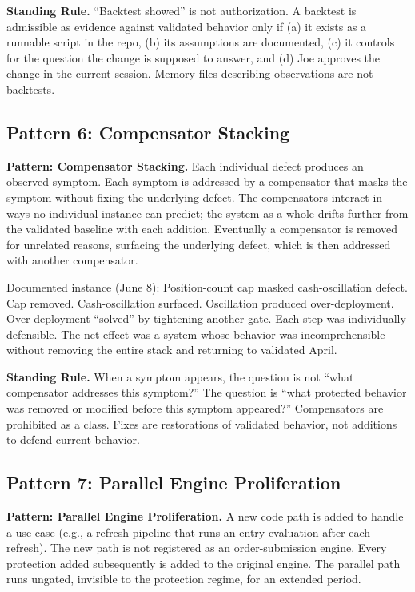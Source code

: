\documentclass[11pt, a4paper]{article}
\newcommand{\rulebox}[1]{%
  \begin{framed}\noindent\textbf{Standing Rule.} #1\end{framed}}
\newcommand{\patternbox}[2]{%
  \begin{framed}\noindent\textbf{Pattern: #1.} #2\end{framed}}
\theoremstyle{definition}
\begin{document}
\rulebox{``Backtest showed'' is not authorization. A backtest is admissible
as evidence against validated behavior only if (a) it exists as a runnable
script in the repo, (b) its assumptions are documented, (c) it controls for
the question the change is supposed to answer, and (d) Joe approves the
change in the current session. Memory files describing observations are not
backtests.}

\subsection{Pattern 6: Compensator Stacking}

\patternbox{Compensator Stacking}{Each individual defect produces an
observed symptom. Each symptom is addressed by a compensator that masks the
symptom without fixing the underlying defect. The compensators interact in
ways no individual instance can predict; the system as a whole drifts
further from the validated baseline with each addition. Eventually a
compensator is removed for unrelated reasons, surfacing the underlying
defect, which is then addressed with another compensator.}

Documented instance (June 8): Position-count cap masked cash-oscillation
defect. Cap removed. Cash-oscillation surfaced. Oscillation produced
over-deployment. Over-deployment ``solved'' by tightening another gate. Each
step was individually defensible. The net effect was a system whose behavior
was incomprehensible without removing the entire stack and returning to
validated April.

\rulebox{When a symptom appears, the question is not ``what compensator
addresses this symptom?'' The question is ``what protected behavior was
removed or modified before this symptom appeared?'' Compensators are
prohibited as a class. Fixes are restorations of validated behavior, not
additions to defend current behavior.}

\subsection{Pattern 7: Parallel Engine Proliferation}

\patternbox{Parallel Engine Proliferation}{A new code path is added to
handle a use case (e.g., a refresh pipeline that runs an entry evaluation
after each refresh). The new path is not registered as an order-submission
engine. Every protection added subsequently is added to the original engine.
The parallel path runs ungated, invisible to the protection regime, for an
extended period.}
\end{document}
